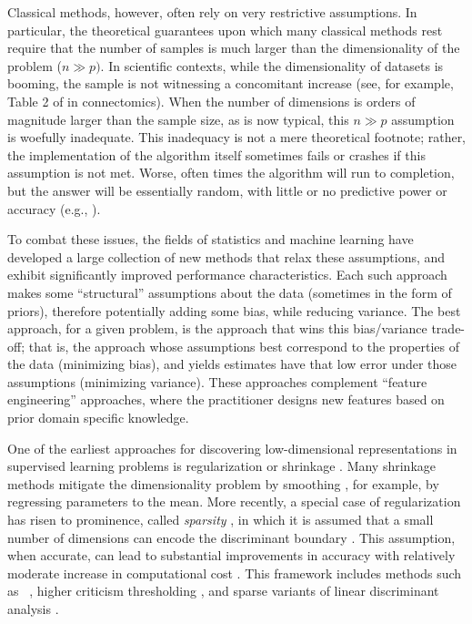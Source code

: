 \documentclass[10pt]{article}
\begin{document}
Classical methods, however, often rely on very restrictive assumptions. In particular, the theoretical guarantees upon which many classical methods rest require that the number of samples is much larger than the dimensionality of the problem ($n \gg p)$.  
In scientific contexts, while the dimensionality of datasets is booming, the sample is not witnessing a concomitant increase (see, for example, Table 2 of \cite{piMartino2014} in connectomics).
When the number of dimensions is orders of magnitude larger than the sample size, as is now typical, this $n \gg p$ assumption is woefully inadequate.
This inadequacy is not a mere theoretical footnote; rather, the implementation of the algorithm itself sometimes fails or crashes if this assumption is not met.  Worse, often times the algorithm will run to completion, but the answer will be essentially random, with little or no predictive power or accuracy (e.g., \cite{Eklund2012a}).

To combat these issues, the fields of statistics and machine learning have developed a large collection of new methods that relax these assumptions, and exhibit significantly improved performance characteristics.  Each such approach makes some ``structural'' assumptions about the data (sometimes in the form of priors), therefore potentially adding some bias, while reducing variance.  The best approach, for a given problem, is the approach that wins this bias/variance trade-off; that is, the approach whose assumptions best correspond to the properties of the data (minimizing bias), and yields estimates have that low error under those assumptions (minimizing variance). These approaches complement ``feature engineering'' approaches, where the practitioner designs new features based on prior domain specific knowledge.



One of the earliest approaches for discovering low-dimensional representations in supervised learning problems is regularization or shrinkage \cite{Friedman1989,Bickel2004,Bouveyron07a}.  Many shrinkage methods  mitigate the dimensionality problem by smoothing \cite{Witten09a}, for example, by regressing parameters to the mean.  More recently, a special case of regularization has risen to prominence, called \emph{sparsity} \cite{Olshausen1997}, in which it is assumed that a small number of dimensions can encode the discriminant boundary \cite{Tibs96}.  This assumption, when accurate, can lead to substantial improvements in accuracy with relatively moderate increase in computational cost \cite{Buhlmann2011}.  This framework includes methods such as ~\cite{Tibs96}, higher criticism thresholding \cite{ponoho08a}, and sparse variants of linear discriminant analysis \cite{Tibshirani2002,Fan2008,Witten09a,Clemmensen2011,Mai2013,Fan2012}.  
\end{document}

